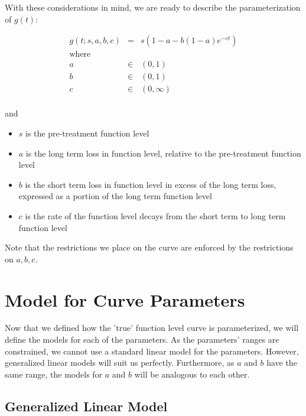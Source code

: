 With these considerations in mind, we are ready to describe the parameterization of $g(t)$:

\begin{eqnarray}
  g(t;s,a,b,c) &=& s(1-a - b(1-a)e^{-ct}) \\
  \textrm{where} \\
  a &\in& (0,1) \\
  b &\in& (0,1) \\
  c &\in& (0,\infty) \\
\end{eqnarray}

and 

\begin{itemize}
  \item $s$ is the pre-treatment function level 
  \item $a$ is the long term loss in function level, relative to the pre-treatment function level
  \item $b$ is the short term loss in function level in excess of the long term loss, expressed as a portion of the long term function level
  \item $c$ is the rate of the function level decays from the short term to long term function level
\end{itemize}

Note that the restrictions we place on the curve are enforced by the restrictions on $a,b,c$.

\section{Model for Curve Parameters}

Now that we defined how the 'true' function level curve is parameterized, we will define the models for each of the parameters.  As the parameters' ranges are constrained, we cannot use a standard linear model for the parameters.  However, generalized linear models will suit us perfectly.  Furthermore, as $a$ and $b$ have the same range, the models for $a$ and $b$ will be analogous to each other.

\subsection{Generalized Linear Model}

